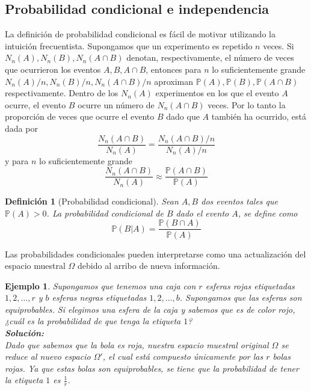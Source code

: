\documentclass[11pt]{report}
\theoremstyle{break}
\newtheorem{definicion}{Definición}[chapter]
\newtheorem{ejemplo}{Ejemplo}[chapter]
\theoremstyle{break}
\begin{document}
\subsection{Probabilidad condicional e independencia}
\label{seccion:probabilidad condicional e independencia}
La definición de probabilidad condicional es fácil de motivar utilizando la intuición frecuentista. Supongamos que un experimento es repetido $n$ veces. Si $N_n(A), N_n(B), N_n(A \cap B)$ denotan, respectivamente, el número de veces que ocurrieron los eventos $A, B, A \cap B$, entonces para $n$ lo suficientemente grande $N_n(A)/n, N_n(B)/n, N_n(A \cap B)/n$ aproximan $\mathbb{P}(A), \mathbb{P}(B), \mathbb{P}(A \cap B)$ respectivamente. Dentro de los $N_n(A)$ experimentos en los que el evento $A$ ocurre, el evento $B$ ocurre un número de $N_n(A \cap B)$ veces. Por lo tanto la proporción de veces que ocurre el evento $B$ dado que $A$ también ha ocurrido, está dada por
$$
\dfrac{N_n(A \cap B)}{N_n(A)} = \dfrac{N_n(A \cap B) / n}{N_n(A) / n}
$$
y para $n$ lo suficientemente grande
$$
\dfrac{N_n(A \cap B)}{N_n(A)} \approx \dfrac{\mathbb{P}(A \cap B)}{\mathbb{P}(A)}
$$
\begin{definicion}[Probabilidad condicional]
\label{definicion:probabilidad condicional}
Sean $A,B$ dos eventos tales que $\mathbb{P}(A) > 0$. La probabilidad condicional de $B$ dado el evento $A$, se define como
$$
\mathbb{P}(B | A) = \dfrac{\mathbb{P}(B \cap A) }{\mathbb{P}(A)}
$$
\end{definicion}
Las probabilidades condicionales pueden interpretarse como una actualización del espacio muestral $\Omega$ debido al arribo de nueva información.

\begin{ejemplo}
Supongamos que tenemos una caja con $r$ esferas rojas etiquetadas $1,2,\ldots,r$ y $b$ esferas negras etiquetadas $1,2,\ldots,b$. Supongamos que las esferas son equiprobables. Si elegimos una esfera de la caja y sabemos que es de color rojo, ¿cuál es la probabilidad de que tenga la etiqueta $1$?
\\ \textbf{Solución:}\\
Dado que sabemos que la bola es roja, nuestra espacio muestral original $\Omega$ se reduce al nuevo espacio $\Omega{'}$, el cual está compuesto únicamente por las $r$ bolas rojas. Ya que estas bolas son equiprobables, se tiene que la probabilidad de tener la etiqueta $1$ es $\tfrac{1}{r}$.
\end{ejemplo}
\end{document}
